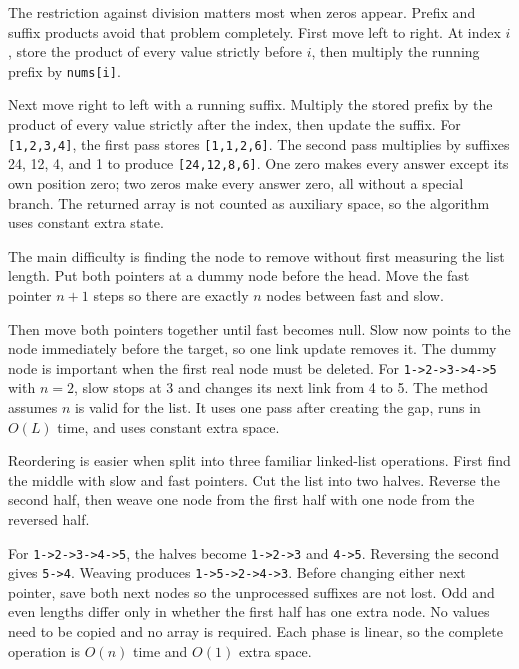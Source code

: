 
\expandafter\def\csname sourcewalkthrough@50\endcsname{%
The restriction against division matters most when zeros appear. Prefix and
suffix products avoid that problem completely. First move left to right. At
index \(i\), store the product of every value strictly before \(i\), then
multiply the running prefix by \texttt{nums[i]}.

Next move right to left with a running suffix. Multiply the stored prefix by
the product of every value strictly after the index, then update the suffix.
For \texttt{[1,2,3,4]}, the first pass stores \texttt{[1,1,2,6]}. The second
pass multiplies by suffixes 24, 12, 4, and 1 to produce
\texttt{[24,12,8,6]}. One zero makes every answer except its own position
zero; two zeros make every answer zero, all without a special branch. The
returned array is not counted as auxiliary space, so the algorithm uses
constant extra state.}

\expandafter\def\csname sourcewalkthrough@51\endcsname{%
The main difficulty is finding the node to remove without first measuring the
list length. Put both pointers at a dummy node before the head. Move the fast
pointer \(n+1\) steps so there are exactly \(n\) nodes between fast and slow.

Then move both pointers together until fast becomes null. Slow now points to
the node immediately before the target, so one link update removes it. The
dummy node is important when the first real node must be deleted. For
\texttt{1->2->3->4->5} with \(n=2\), slow stops at 3 and changes its next
link from 4 to 5. The method assumes \(n\) is valid for the list. It uses one
pass after creating the gap, runs in \(O(L)\) time, and uses constant extra
space.}

\expandafter\def\csname sourcewalkthrough@52\endcsname{%
Reordering is easier when split into three familiar linked-list operations.
First find the middle with slow and fast pointers. Cut the list into two
halves. Reverse the second half, then weave one node from the first half with
one node from the reversed half.

For \texttt{1->2->3->4->5}, the halves become \texttt{1->2->3} and
\texttt{4->5}. Reversing the second gives \texttt{5->4}. Weaving produces
\texttt{1->5->2->4->3}. Before changing either next pointer, save both next
nodes so the unprocessed suffixes are not lost. Odd and even lengths differ
only in whether the first half has one extra node. No values need to be copied
and no array is required. Each phase is linear, so the complete operation is
\(O(n)\) time and \(O(1)\) extra space.}

